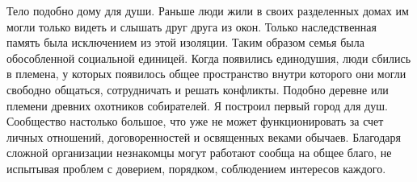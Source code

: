 \documentclass[12pt,a4paper]{article}
\begin{document}
Тело подобно дому для души. Раньше люди жили в своих разделенных домах им могли только видеть и слышать друг друга из окон. Только наследственная память была исключением из этой изоляции. Таким образом семья была обособленной социальной единицей. Когда появились единодушия, люди сбились в племена, у которых появилось общее пространство внутри которого они могли свободно общаться, сотрудничать и решать конфликты. Подобно деревне или племени древних охотников собирателей. Я построил первый город для душ. Сообщество настолько большое, что уже не может функционировать за счет личных отношений, договоренностей и освященных веками обычаев. Благодаря сложной организации незнакомцы могут работают сообща на общее благо, не испытывая проблем с доверием, порядком, соблюдением интересов каждого.
\end{document}
